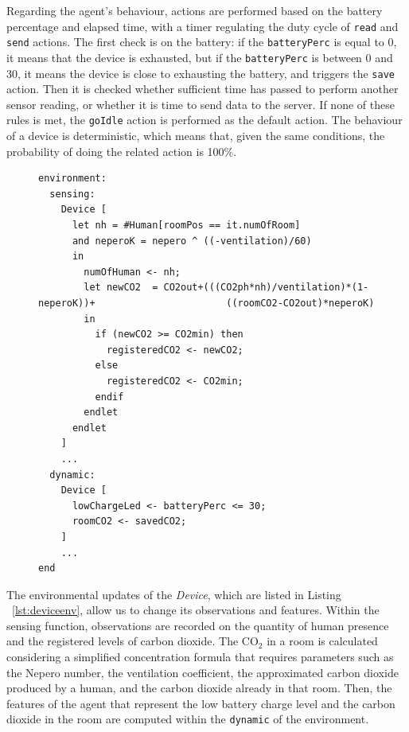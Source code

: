 \documentclass[runningheads]{llncs}
\begin{document}
Regarding the agent's behaviour, actions are performed based on the battery percentage and elapsed time, with a timer regulating the duty cycle of \lstinline{read} and \lstinline{send} actions.
%
The first check is on the battery: if the \lstinline{batteryPerc} is equal to 0, it means that the device is exhausted, but if the \lstinline{batteryPerc} is between 0 and 30, it means the device is close to exhausting the battery, and triggers the \lstinline{save} action.
%
Then it is checked whether sufficient time has passed to perform another sensor reading, or whether it is time to send data to the server.
%
If none of these rules is met, the \lstinline{goIdle} action is performed as the default action.
%
The behaviour of a device is deterministic, which means that, given the same conditions, the probability of doing the related action is 100\%.


\begin{figure}[htbp!]
\begin{lstlisting}[language=yoda,basicstyle=\scriptsize, caption={IAQ Scenario: \textsf{Device} Sensing and Dynamic Functions}, label={lst:deviceenv}]
environment:
  sensing:
    Device [
      let nh = #Human[roomPos == it.numOfRoom]
      and neperoK = nepero ^ ((-ventilation)/60)
      in
        numOfHuman <- nh;
        let newCO2  = CO2out+(((CO2ph*nh)/ventilation)*(1-neperoK))+                       ((roomCO2-CO2out)*neperoK)
        in
          if (newCO2 >= CO2min) then
            registeredCO2 <- newCO2;
          else
            registeredCO2 <- CO2min;
          endif
        endlet
      endlet
    ]
    ...
  dynamic:
    Device [
      lowChargeLed <- batteryPerc <= 30;
      roomCO2 <- savedCO2;
    ]
    ...
end
\end{lstlisting}
\end{figure}

The environmental updates of the \emph{Device}, which are listed in Listing ~\ref{lst:deviceenv}, allow us to change its observations and features. Within the sensing function, observations are recorded on the quantity of human presence and the registered levels of carbon dioxide. 
%
%
The CO$_2$ in a room is calculated considering a simplified concentration formula that requires parameters such as the Nepero number, the ventilation coefficient, the approximated carbon dioxide produced by a human, and the carbon dioxide already in that room.
%
Then, the features of the agent that represent the low battery charge level and the carbon dioxide in the room are computed within the \lstinline{dynamic} of the environment.
\end{document}
